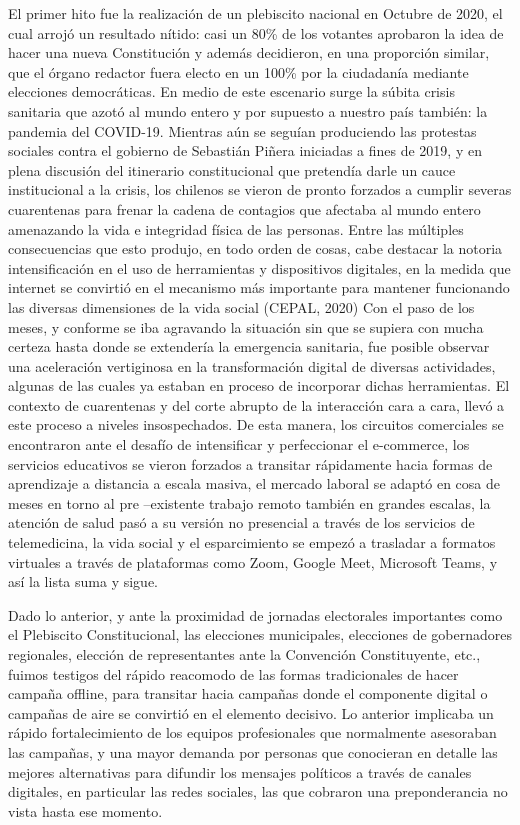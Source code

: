 \documentclass[
  10pt,
  letterpaper,
]{report}
\begin{document}
El primer hito fue la realización de un plebiscito nacional en Octubre
de 2020, el cual arrojó un resultado nítido: casi un 80\% de los
votantes aprobaron la idea de hacer una nueva Constitución y además
decidieron, en una proporción similar, que el órgano redactor fuera
electo en un 100\% por la ciudadanía mediante elecciones democráticas.
En medio de este escenario surge la súbita crisis sanitaria que azotó al
mundo entero y por supuesto a nuestro país también: la pandemia del
COVID-19. Mientras aún se seguían produciendo las protestas sociales
contra el gobierno de Sebastián Piñera iniciadas a fines de 2019, y en
plena discusión del itinerario constitucional que pretendía darle un
cauce institucional a la crisis, los chilenos se vieron de pronto
forzados a cumplir severas cuarentenas para frenar la cadena de
contagios que afectaba al mundo entero amenazando la vida e integridad
física de las personas. Entre las múltiples consecuencias que esto
produjo, en todo orden de cosas, cabe destacar la notoria
intensificación en el uso de herramientas y dispositivos digitales, en
la medida que internet se convirtió en el mecanismo más importante para
mantener funcionando las diversas dimensiones de la vida social (CEPAL,
2020) Con el paso de los meses, y conforme se iba agravando la situación
sin que se supiera con mucha certeza hasta donde se extendería la
emergencia sanitaria, fue posible observar una aceleración vertiginosa
en la transformación digital de diversas actividades, algunas de las
cuales ya estaban en proceso de incorporar dichas herramientas. El
contexto de cuarentenas y del corte abrupto de la interacción cara a
cara, llevó a este proceso a niveles insospechados. De esta manera, los
circuitos comerciales se encontraron ante el desafío de intensificar y
perfeccionar el e-commerce, los servicios educativos se vieron forzados
a transitar rápidamente hacia formas de aprendizaje a distancia a escala
masiva, el mercado laboral se adaptó en cosa de meses en torno al pre
--existente trabajo remoto también en grandes escalas, la atención de
salud pasó a su versión no presencial a través de los servicios de
telemedicina, la vida social y el esparcimiento se empezó a trasladar a
formatos virtuales a través de plataformas como Zoom, Google Meet,
Microsoft Teams, y así la lista suma y sigue.

Dado lo anterior, y ante la proximidad de jornadas electorales
importantes como el Plebiscito Constitucional, las elecciones
municipales, elecciones de gobernadores regionales, elección de
representantes ante la Convención Constituyente, etc., fuimos testigos
del rápido reacomodo de las formas tradicionales de hacer campaña
offline, para transitar hacia campañas donde el componente digital o
campañas de aire se convirtió en el elemento decisivo. Lo anterior
implicaba un rápido fortalecimiento de los equipos profesionales que
normalmente asesoraban las campañas, y una mayor demanda por personas
que conocieran en detalle las mejores alternativas para difundir los
mensajes políticos a través de canales digitales, en particular las
redes sociales, las que cobraron una preponderancia no vista hasta ese
momento.
\end{document}
